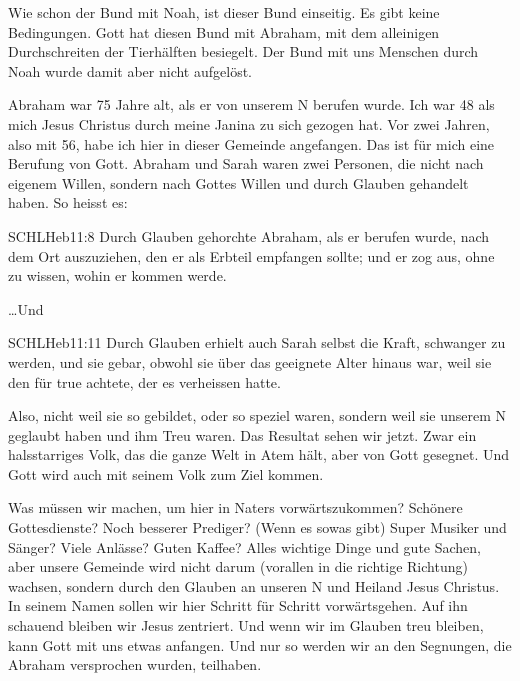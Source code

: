   		Wie schon der Bund mit Noah, ist dieser Bund einseitig. Es gibt keine Bedingungen. Gott hat diesen Bund mit Abraham, mit dem alleinigen Durchschreiten der Tierhälften besiegelt. Der Bund mit uns Menschen durch Noah wurde damit aber nicht aufgelöst.

        Abraham war 75 Jahre alt, als er von unserem \herr N berufen wurde. Ich war 48 als mich Jesus Christus durch meine Janina zu sich gezogen hat. Vor zwei Jahren, also mit 56, habe ich hier in dieser Gemeinde angefangen. Das ist für mich eine Berufung von Gott. Abraham und Sarah waren zwei Personen, die nicht nach eigenem Willen, sondern nach Gottes Willen und durch Glauben gehandelt haben. So heisst es:
        \begin{bibelquote}{SCHL}{Heb}{11:8}
            Durch Glauben gehorchte Abraham, als er berufen wurde, nach dem Ort auszuziehen, den er als Erbteil empfangen sollte; und er zog aus, ohne zu wissen, wohin er kommen werde.
        \end{bibelquote}
        \dots Und
        \begin{bibelquote}{SCHL}{Heb}{11:11}
            Durch Glauben erhielt auch Sarah selbst die Kraft, schwanger zu werden, und sie gebar, obwohl sie über das geeignete Alter hinaus war, weil sie den für true achtete, der es verheissen hatte.
        \end{bibelquote}
        Also, nicht weil sie so gebildet, oder so speziel waren, sondern weil sie unserem \herr N geglaubt haben und ihm Treu waren. Das Resultat sehen wir jetzt. Zwar ein halsstarriges Volk, das die ganze Welt in Atem hält, aber von Gott gesegnet. Und Gott wird auch mit seinem Volk zum Ziel kommen.
        
        Was müssen wir machen, um hier in Naters vorwärtszukommen? Schönere Gottesdienste? Noch besserer Prediger? (Wenn es sowas gibt) Super Musiker und Sänger? Viele Anlässe? Guten Kaffee? Alles wichtige Dinge und gute Sachen, aber unsere Gemeinde wird nicht darum (vorallen in die richtige Richtung) wachsen, sondern durch den Glauben an unseren \herr N und Heiland Jesus Christus. In seinem Namen sollen wir hier Schritt für Schritt vorwärtsgehen. Auf ihn schauend bleiben wir Jesus zentriert. Und wenn wir im Glauben treu bleiben, kann Gott mit uns etwas anfangen. Und nur so werden wir an den Segnungen, die Abraham versprochen wurden, teilhaben.

      

